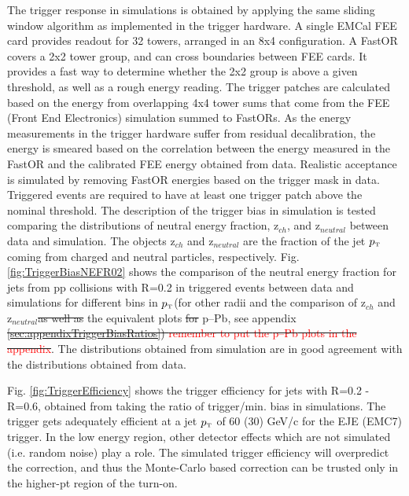 \documentclass[ALICE]{ALICE_analysis_notes}
\newcommand{\pT}{$p_{\mbox{\tiny T}}$\xspace}
\newcommand{\pPb}{{\mbox{p--Pb}}\xspace}
\newcommand{\pp}{pp\xspace}
\providecommand{\DIFaddtex}[1]{{\protect\color{blue}\uwave{#1}}} %
\providecommand{\DIFdeltex}[1]{{\protect\color{red}\sout{#1}}}                      %
\providecommand{\DIFaddbegin}{} %
\providecommand{\DIFaddend}{} %
\providecommand{\DIFdelbegin}{} %
\providecommand{\DIFdelend}{} %
\providecommand{\DIFadd}[1]{\texorpdfstring{\DIFaddtex{#1}}{#1}} %
\providecommand{\DIFdel}[1]{\texorpdfstring{\DIFdeltex{#1}}{}} %
\newcommand{\DIFscaledelfig}{0.5}
\newlength{\DIFdelgraphicswidth} %
\newlength{\DIFdelgraphicsheight} %
\newcommand{\DIFaddincludegraphics}[2][]{{\color{blue}\fbox{\DIFOincludegraphics[#1]{#2}}}} %
\newcommand{\DIFdelincludegraphics}[2][]{%
\sbox{\DIFdelgraphicsbox}{\DIFOincludegraphics[#1]{#2}}%
\settoboxwidth{\DIFdelgraphicswidth}{\DIFdelgraphicsbox} %
\settoboxtotalheight{\DIFdelgraphicsheight}{\DIFdelgraphicsbox} %
\scalebox{\DIFscaledelfig}{%
\parbox[b]{\DIFdelgraphicswidth}{\usebox{\DIFdelgraphicsbox}\\[-\baselineskip] \rule{\DIFdelgraphicswidth}{0em}}\llap{\resizebox{\DIFdelgraphicswidth}{\DIFdelgraphicsheight}{%
\setlength{\unitlength}{\DIFdelgraphicswidth}%
\begin{picture}(1,1)%
\thicklines\linethickness{2pt} %
{\color[rgb]{1,0,0}\put(0,0){\framebox(1,1){}}}%
{\color[rgb]{1,0,0}\put(0,0){\line( 1,1){1}}}%
{\color[rgb]{1,0,0}\put(0,1){\line(1,-1){1}}}%
\end{picture}%
}\hspace*{3pt}}} %
} %
\DeclareRobustCommand{\DIFaddbegin}{\DIFOaddbegin \let\includegraphics\DIFaddincludegraphics} %
\DeclareRobustCommand{\DIFaddend}{\DIFOaddend \let\includegraphics\DIFOincludegraphics} %
\DeclareRobustCommand{\DIFdelbegin}{\DIFOdelbegin \let\includegraphics\DIFdelincludegraphics} %
\DeclareRobustCommand{\DIFdelend}{\DIFOaddend \let\includegraphics\DIFOincludegraphics} %
\begin{document}
The trigger response in simulations is obtained by applying the same sliding window algorithm as implemented in the trigger hardware. A single EMCal FEE card provides readout for 32 towers, arranged in an 8x4 configuration. A FastOR covers a 2x2 tower group, and can cross boundaries between FEE cards. It provides a fast way to determine whether the 2x2 group is above a given threshold, as well as a rough energy reading. The trigger patches are calculated based on the energy from overlapping 4x4 tower sums that come from the FEE (Front End Electronics) simulation summed to FastORs. As the energy measurements in the trigger hardware suffer from residual decalibration, the energy is smeared based on the correlation between the energy measured in the FastOR and the calibrated FEE energy obtained from data. Realistic acceptance is simulated by removing FastOR energies based on the trigger mask in data. Triggered events are required to have at least one trigger patch above the nominal threshold. The description of the trigger bias in simulation is tested comparing the distributions of neutral energy fraction, z$_{ch}$, and z$_{neutral}$ between data and simulation. The objects z$_{ch}$ and z$_{neutral}$ are the fraction of the jet \pT coming from charged and neutral particles, respectively. Fig. \ref{fig:TriggerBiasNEFR02} shows the comparison of the neutral energy fraction for jets from \pp collisions with R=0.2 in triggered events between data and simulations for different bins in \pT (for other radii and the comparison of z$_{ch}$ and z$_{neutral}$\DIFdelbegin \DIFdel{as well as }\DIFdelend \DIFaddbegin \DIFadd{, see appendix \ref{sec:appendixTriggerBiasRatios}). For }\DIFaddend the equivalent plots \DIFdelbegin \DIFdel{for }\DIFdelend \DIFaddbegin \DIFadd{in }\DIFaddend \pPb, see appendix \DIFdelbegin \DIFdel{\ref{sec:appendixTriggerBiasRatios}) \textcolor{red}{remember to put the \pPb plots in the appendix}}\DIFdelend \DIFaddbegin \DIFadd{\ref{sec:appendixTriggerBiasRatiospPb}}\DIFaddend . The distributions obtained from simulation are in good agreement with the distributions obtained from data. 

Fig. \ref{fig:TriggerEfficiency} shows the trigger efficiency for jets with R=0.2 - R=0.6, obtained from taking the ratio of trigger/min. bias in simulations. The trigger gets adequately efficient at a jet \pT of 60 (30) GeV/c for the EJE (EMC7) trigger. In the low energy region, other detector effects which are not simulated (i.e. random noise) play a role. The simulated trigger efficiency will overpredict the correction, and thus the Monte-Carlo based correction can be trusted only in the higher-pt region of the turn-on.
\end{document}
